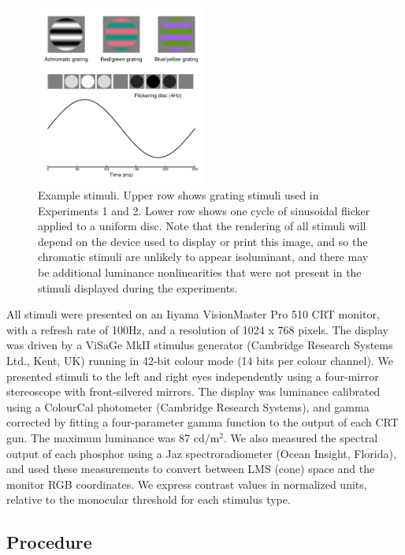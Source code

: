 \documentclass[
  letterpaper,
  DIV=11,
  numbers=noendperiod]{scrartcl}
\begin{document}
\begin{figure}

{\centering \includegraphics[width=0.5\textwidth,height=\textheight]{Figures/examplestim.pdf}

}

\caption{\label{fig-examplestim}Example stimuli. Upper row shows grating
stimuli used in Experiments 1 and 2. Lower row shows one cycle of
sinusoidal flicker applied to a uniform disc. Note that the rendering of
all stimuli will depend on the device used to display or print this
image, and so the chromatic stimuli are unlikely to appear isoluminant,
and there may be additional luminance nonlinearities that were not
present in the stimuli displayed during the experiments.}

\end{figure}

All stimuli were presented on an Iiyama VisionMaster Pro 510 CRT
monitor, with a refresh rate of 100Hz, and a resolution of 1024 x 768
pixels. The display was driven by a ViSaGe MkII stimulus generator
(Cambridge Research Systems Ltd., Kent, UK) running in 42-bit colour
mode (14 bits per colour channel). We presented stimuli to the left and
right eyes independently using a four-mirror stereoscope with
front-silvered mirrors. The display was luminance calibrated using a
ColourCal photometer (Cambridge Research Systems), and gamma corrected
by fitting a four-parameter gamma function to the output of each CRT
gun. The maximum luminance was 87 cd/m\(^2\). We also measured the
spectral output of each phosphor using a Jaz spectroradiometer (Ocean
Insight, Florida), and used these measurements to convert between LMS
(cone) space and the monitor RGB coordinates. We express contrast values
in normalized units, relative to the monocular threshold for each
stimulus type.

\hypertarget{procedure}{%
\subsection{Procedure}\label{procedure}}
\end{document}
